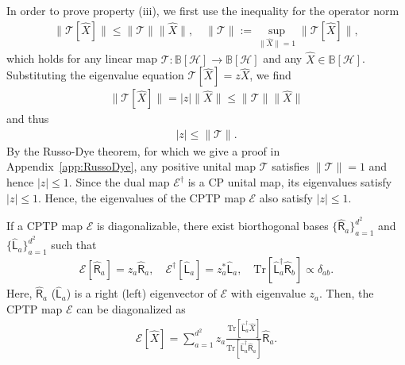 \documentclass[preprint,pteplogo]{ptephy_v2}%
\numberwithin{equation}{section}
\theoremstyle{definition}
\newcommand{\mc}[1]{\mathcal{#1}}
\newcommand{\mr}[1]{\mathrm{#1}}
\newcommand{\mbb}[1]{\mathbb{#1}}
\newcommand{\Tr}{\mr{Tr}}
\begin{document}
In order to prove property (iii), we first use the inequality for the operator norm 
\begin{align}
\lVert \mc{T}[\hat{X}] \rVert \leq \lVert \mc{T} \rVert \lVert \hat{X} \rVert, \quad
\lVert \mc{T} \rVert := \sup_{\lVert \hat{X} \rVert = 1} \lVert \mc{T}[\hat{X}] \rVert,
\end{align}
which holds for any linear map $\mc{T}: \mbb{B}[\mc{H}] \to \mbb{B}[\mc{H}]$ and any $\hat{X} \in \mbb{B}[\mc{H}]$.
Substituting the eigenvalue equation $\mc{T}[\hat{X}] = z \hat{X}$, we find
\begin{align}
\lVert \mc{T}[\hat{X}] \rVert = |z| \lVert \hat{X} \rVert \leq \lVert \mc{T} \rVert \lVert \hat{X} \rVert
\end{align}
and thus
\begin{align}
|z| \leq \lVert \mc{T} \rVert.
\end{align}
By the Russo-Dye theorem, for which we give a proof in Appendix~\ref{app:RussoDye}, any positive unital map $\mc{T}$ satisfies $\lVert \mc{T} \rVert = 1$ and hence $|z| \leq 1$.
Since the dual map $\mc{E}^\dagger$ is a CP unital map, its eigenvalues satisfy $|z| \leq 1$. 
Hence, the eigenvalues of the CPTP map $\mc{E}$ also satisfy $|z| \leq 1$.

If a CPTP map $\mc{E}$ is diagonalizable, there exist biorthogonal bases $\{ \hat{\mathsf{R}}_a \}_{a=1}^{d^2}$ and $\{ \hat{\mathsf{L}}_a \}_{a=1}^{d^2}$ such that
\begin{align}\label{eigenvalueCPTP}
\mc{E}[\hat{\mathsf{R}}_a] = z_a \hat{\mathsf{R}}_a, \quad
\mc{E}^\dagger[\hat{\mathsf{L}}_a] = z_a^* \hat{\mathsf{L}}_a, \quad
\Tr[\hat{\mathsf{L}}_a^\dagger \hat{\mathsf{R}}_b] \propto \delta_{ab}.
\end{align}
Here, $\hat{\mathsf{R}}_a$ ($\hat{\mathsf{L}}_a$) is a right (left) eigenvector of $\mc{E}$ with eigenvalue $z_a$.
Then, the CPTP map $\mc{E}$ can be diagonalized as 
\begin{align}
\mc{E}[\hat{X}] = \sum_{a=1}^{d^2} z_a \frac{\Tr [\hat{\mathsf{L}}_a^\dagger \hat{X}]}{\Tr [\hat{\mathsf{L}}_a^\dagger \hat{\mathsf{R}}_a]} \hat{\mathsf{R}}_a.
\end{align}
\end{document}
